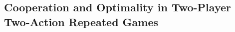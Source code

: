 \documentclass{article}
\begin{document}



\newpage
\subsection{Cooperation and Optimality in Two-Player Two-Action Repeated Games}
\end{document}
